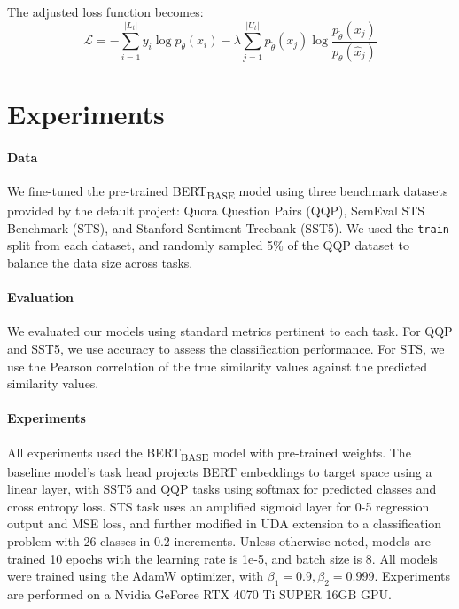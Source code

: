 \documentclass{article}
\begin{document}
The adjusted loss function becomes:
$$\mathcal{L} = 
- \sum_{i=1}^{|L_t|} y_i \log p_{\theta}(x_i)
- \lambda \sum_{j=1}^{|U_t|} p_{\tilde{\theta}}(x_j) \log 
\frac{p_{\tilde{\theta}}(x_j)}{p_{\theta}(\hat x_j)}
$$

\section{Experiments}
\paragraph{Data}
We fine-tuned the pre-trained BERT\textsubscript{BASE} model using three benchmark datasets
provided by the default project: 
Quora Question Pairs (QQP), SemEval STS Benchmark (STS), and Stanford Sentiment Treebank 
(SST5). We used the \texttt{train} split from each dataset, and randomly sampled 5\% of the 
QQP dataset to balance the data size across tasks.

\paragraph{Evaluation}
We evaluated our models using standard metrics pertinent to each task. 
For QQP and SST5, we use accuracy to assess the classification performance. 
For STS, we use the Pearson correlation of the true similarity values against the predicted 
similarity values.

\paragraph{Experiments}
All experiments used the BERT\textsubscript{BASE} model with pre-trained weights. The 
baseline model's task head projects BERT embeddings to target space using a linear layer, 
with SST5 and QQP tasks using softmax for predicted classes and cross entropy loss. STS 
task uses an amplified sigmoid layer for 0-5 regression output and MSE loss, and further
modified in UDA extension to a classification problem with 26 classes in 0.2 
increments. Unless otherwise noted, models are trained 10 epochs with 
the learning rate is 1e-5, and batch size is 8. All 
models were trained using the AdamW optimizer, with $\beta_1 = 0.9, \beta_2 = 0.999$.
Experiments are performed on a Nvidia GeForce RTX 4070 Ti SUPER 16GB GPU. 
\end{document}
